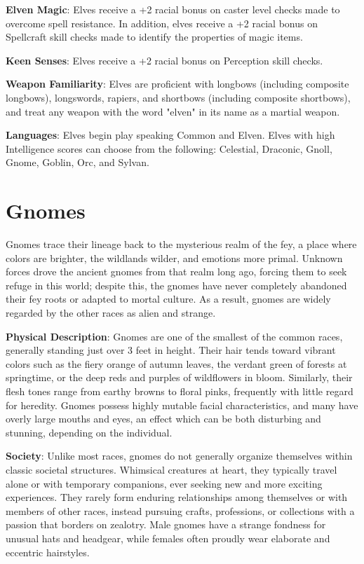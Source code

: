 \textbf{Elven Magic}: Elves receive a +2 racial bonus on caster level checks made to overcome spell resistance. In addition, elves receive a +2 racial bonus on Spellcraft skill checks made to identify the properties of magic items.
				
\textbf{Keen Senses}: Elves receive a +2 racial bonus on Perception skill checks.
				
\textbf{Weapon Familiarity}: Elves are proficient with longbows (including composite longbows), longswords, rapiers, and shortbows (including composite shortbows), and treat any weapon with the word "elven" in its name as a martial weapon.
				
\textbf{Languages}: Elves begin play speaking Common and Elven. Elves with high Intelligence scores can choose from the following: Celestial, Draconic, Gnoll, Gnome, Goblin, Orc, and Sylvan.
							
\section{Gnomes}

				
Gnomes trace their lineage back to the mysterious realm of the fey, a place where colors are brighter, the wildlands wilder, and emotions more primal. Unknown forces drove the ancient gnomes from that realm long ago, forcing them to seek refuge in this world; despite this, the gnomes have never completely abandoned their fey roots or adapted to mortal culture. As a result, gnomes are widely regarded by the other races as alien and strange. 
				
\textbf{Physical Description}: Gnomes are one of the smallest of the common races, generally standing just over 3 feet in height. Their hair tends toward vibrant colors such as the fiery orange of autumn leaves, the verdant green of forests at springtime, or the deep reds and purples of wildflowers in bloom. Similarly, their flesh tones range from earthy browns to floral pinks, frequently with little regard for heredity. Gnomes possess highly mutable facial characteristics, and many have overly large mouths and eyes, an effect which can be both disturbing and stunning, depending on the individual.
				
\textbf{Society}: Unlike most races, gnomes do not generally organize themselves within classic societal structures. Whimsical creatures at heart, they typically travel alone or with temporary companions, ever seeking new and more exciting experiences. They rarely form enduring relationships among themselves or with members of other races, instead pursuing crafts, professions, or collections with a passion that borders on zealotry. Male gnomes have a strange fondness for unusual hats and headgear, while females often proudly wear elaborate and eccentric hairstyles.
				
